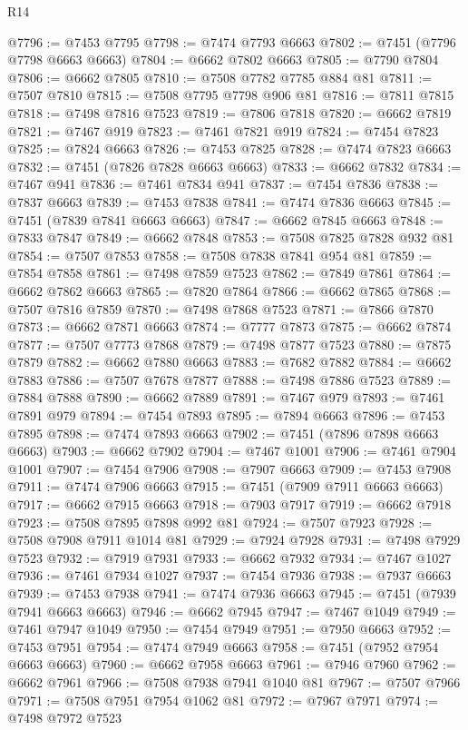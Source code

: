 \begin{lexlean}{R14}
\begin{coremodule}
{{{{{{{{{{{{{{{{{{{{{{{{{{{{{{{{{{{{{{{{{{{{{{{{{{{{{{{{{{{{{{{{{{{{{{{{{{{{{{{{{{@7796 := @7453 @7795
@7798 := @7474 @7793 @6663
@7802 := @7451 (@7796 @7798 @6663 @6663)
@7804 := @6662 @7802 @6663
@7805 := @7790 @7804
@7806 := @6662 @7805
@7810 := @7508 @7782 @7785 @884 @81
@7811 := @7507 @7810
@7815 := @7508 @7795 @7798 @906 @81
@7816 := @7811 @7815
@7818 := @7498 @7816 @7523
@7819 := @7806 @7818
@7820 := @6662 @7819
@7821 := @7467 @919
@7823 := @7461 @7821 @919
@7824 := @7454 @7823
@7825 := @7824 @6663
@7826 := @7453 @7825
@7828 := @7474 @7823 @6663
@7832 := @7451 (@7826 @7828 @6663 @6663)
@7833 := @6662 @7832
@7834 := @7467 @941
@7836 := @7461 @7834 @941
@7837 := @7454 @7836
@7838 := @7837 @6663
@7839 := @7453 @7838
@7841 := @7474 @7836 @6663
@7845 := @7451 (@7839 @7841 @6663 @6663)
@7847 := @6662 @7845 @6663
@7848 := @7833 @7847
@7849 := @6662 @7848
@7853 := @7508 @7825 @7828 @932 @81
@7854 := @7507 @7853
@7858 := @7508 @7838 @7841 @954 @81
@7859 := @7854 @7858
@7861 := @7498 @7859 @7523
@7862 := @7849 @7861
@7864 := @6662 @7862 @6663
@7865 := @7820 @7864
@7866 := @6662 @7865
@7868 := @7507 @7816 @7859
@7870 := @7498 @7868 @7523
@7871 := @7866 @7870
@7873 := @6662 @7871 @6663
@7874 := @7777 @7873
@7875 := @6662 @7874
@7877 := @7507 @7773 @7868
@7879 := @7498 @7877 @7523
@7880 := @7875 @7879
@7882 := @6662 @7880 @6663
@7883 := @7682 @7882
@7884 := @6662 @7883
@7886 := @7507 @7678 @7877
@7888 := @7498 @7886 @7523
@7889 := @7884 @7888
@7890 := @6662 @7889
@7891 := @7467 @979
@7893 := @7461 @7891 @979
@7894 := @7454 @7893
@7895 := @7894 @6663
@7896 := @7453 @7895
@7898 := @7474 @7893 @6663
@7902 := @7451 (@7896 @7898 @6663 @6663)
@7903 := @6662 @7902
@7904 := @7467 @1001
@7906 := @7461 @7904 @1001
@7907 := @7454 @7906
@7908 := @7907 @6663
@7909 := @7453 @7908
@7911 := @7474 @7906 @6663
@7915 := @7451 (@7909 @7911 @6663 @6663)
@7917 := @6662 @7915 @6663
@7918 := @7903 @7917
@7919 := @6662 @7918
@7923 := @7508 @7895 @7898 @992 @81
@7924 := @7507 @7923
@7928 := @7508 @7908 @7911 @1014 @81
@7929 := @7924 @7928
@7931 := @7498 @7929 @7523
@7932 := @7919 @7931
@7933 := @6662 @7932
@7934 := @7467 @1027
@7936 := @7461 @7934 @1027
@7937 := @7454 @7936
@7938 := @7937 @6663
@7939 := @7453 @7938
@7941 := @7474 @7936 @6663
@7945 := @7451 (@7939 @7941 @6663 @6663)
@7946 := @6662 @7945
@7947 := @7467 @1049
@7949 := @7461 @7947 @1049
@7950 := @7454 @7949
@7951 := @7950 @6663
@7952 := @7453 @7951
@7954 := @7474 @7949 @6663
@7958 := @7451 (@7952 @7954 @6663 @6663)
@7960 := @6662 @7958 @6663
@7961 := @7946 @7960
@7962 := @6662 @7961
@7966 := @7508 @7938 @7941 @1040 @81
@7967 := @7507 @7966
@7971 := @7508 @7951 @7954 @1062 @81
@7972 := @7967 @7971
@7974 := @7498 @7972 @7523
}}}}}}}}}}}}}}}}}}}}}}}}}}}}}}}}}}}}}}}}}}}}}}}}}}}}}}}}}}}}}}}}}}}}}}}}}}}}}}}}}}
\end{coremodule}
\end{lexlean}
